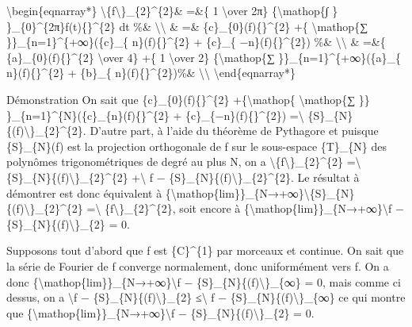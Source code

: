 \documentclass[]{article}
\begin{document}
\textbackslash{}begin\{eqnarray*\}
\textbackslash{}\textbar{}\{f\textbackslash{}\textbar{}\}\_\{2\}\^{}\{2\}\&
=\&\{ 1 \textbackslash{}over 2π\} \{\textbackslash{}mathop\{∫ \}
\}\_\{0\}\^{}\{2π\}\textbar{}f(t)\{\textbar{}\}\^{}\{2\} dt \%\&
\textbackslash{}\textbackslash{} \& =\&
\textbar{}\{c\}\_\{0\}(f)\{\textbar{}\}\^{}\{2\} +\{
\textbackslash{}mathop\{∑ \}\}\_\{n=1\}\^{}\{+∞\}(\textbar{}\{c\}\_\{
n\}(f)\{\textbar{}\}\^{}\{2\} + \textbar{}\{c\}\_\{
−n\}(f)\{\textbar{}\}\^{}\{2\}) \%\& \textbackslash{}\textbackslash{} \&
=\&\{ \textbar{}\{a\}\_\{0\}(f)\{\textbar{}\}\^{}\{2\}
\textbackslash{}over 4\} +\{ 1 \textbackslash{}over 2\}
\{\textbackslash{}mathop\{∑ \}\}\_\{n=1\}\^{}\{+∞\}(\textbar{}\{a\}\_\{
n\}(f)\{\textbar{}\}\^{}\{2\} + \textbar{}\{b\}\_\{
n\}(f)\{\textbar{}\}\^{}\{2\})\%\& \textbackslash{}\textbackslash{}
\textbackslash{}end\{eqnarray*\}

Démonstration On sait que
\textbar{}\{c\}\_\{0\}(f)\{\textbar{}\}\^{}\{2\}
+\{\textbackslash{}mathop\{ \textbackslash{}mathop\{∑ \}\}
\}\_\{n=1\}\^{}\{N\}(\textbar{}\{c\}\_\{n\}(f)\{\textbar{}\}\^{}\{2\} +
\textbar{}\{c\}\_\{−n\}(f)\{\textbar{}\}\^{}\{2\})
=\textbackslash{}\textbar{}
\{S\}\_\{N\}\{(f)\textbackslash{}\textbar{}\}\_\{2\}\^{}\{2\}. D'autre
part, à l'aide du théorème de Pythagore et puisque \{S\}\_\{N\}(f) est
la projection orthogonale de f sur le sous-espace \{T\}\_\{N\} des
polynômes trigonométriques de degré au plus N, on a
\textbackslash{}\textbar{}\{f\textbackslash{}\textbar{}\}\_\{2\}\^{}\{2\}
=\textbackslash{}\textbar{}
\{S\}\_\{N\}\{(f)\textbackslash{}\textbar{}\}\_\{2\}\^{}\{2\}
+\textbackslash{}\textbar{} f −
\{S\}\_\{N\}\{(f)\textbackslash{}\textbar{}\}\_\{2\}\^{}\{2\}. Le
résultat à démontrer est donc équivalent à
\{\textbackslash{}mathop\{lim\}\}\_\{N→+∞\}\textbackslash{}\textbar{}\{S\}\_\{N\}\{(f)\textbackslash{}\textbar{}\}\_\{2\}\^{}\{2\}
=\textbackslash{}\textbar{}
\{f\textbackslash{}\textbar{}\}\_\{2\}\^{}\{2\}, soit encore à
\{\textbackslash{}mathop\{lim\}\}\_\{N→+∞\}\textbackslash{}\textbar{}f −
\{S\}\_\{N\}\{(f)\textbackslash{}\textbar{}\}\_\{2\} = 0.

Supposons tout d'abord que f est \{C\}\^{}\{1\} par morceaux et
continue. On sait que la série de Fourier de f converge normalement,
donc uniformément vers f. On a donc
\{\textbackslash{}mathop\{lim\}\}\_\{N→+∞\}\textbackslash{}\textbar{}f −
\{S\}\_\{N\}\{(f)\textbackslash{}\textbar{}\}\_\{∞\} = 0, mais comme ci
dessus, on a \textbackslash{}\textbar{}f −
\{S\}\_\{N\}\{(f)\textbackslash{}\textbar{}\}\_\{2\}
≤\textbackslash{}\textbar{} f −
\{S\}\_\{N\}\{(f)\textbackslash{}\textbar{}\}\_\{∞\} ce qui montre que
\{\textbackslash{}mathop\{lim\}\}\_\{N→+∞\}\textbackslash{}\textbar{}f −
\{S\}\_\{N\}\{(f)\textbackslash{}\textbar{}\}\_\{2\} = 0.
\end{document}
